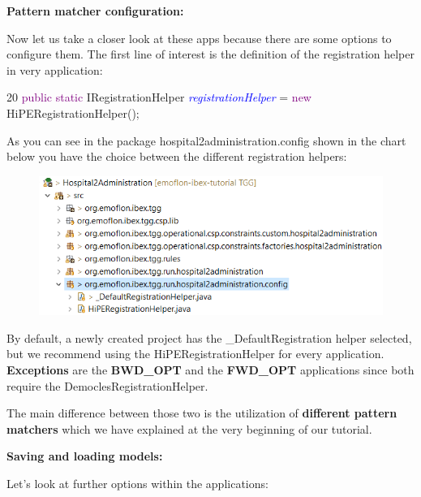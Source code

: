 {\textbf{Pattern matcher configuration:}

Now let us take a closer look at these apps because there are some options to configure them.
The first line of interest is the definition of the registration helper in very application:\newline

20\hspace{0.5cm} \textcolor{Purple}{public static} IRegistrationHelper \textcolor{Blue}{\textit{registrationHelper}} = \textcolor{Purple}{new} HiPERegistrationHelper();\newline

As you can see in the package \textsf{hospital2administration.config} shown in the chart below you have the choice between the different registration helpers:\newline

\begin{figure}[h]
    \centering
    \includegraphics[scale=0.65 ]{pictures/registrationHelpers.png}
    \caption{}
    \label{setDefaultNumber}
\end{figure}

By default, a newly created project has the \textsf{\_DefaultRegistration} helper selected, but we recommend using the \textsf{HiPERegistrationHelper} for every application. \textbf{Exceptions} are the \textbf{BWD\_OPT} and the \textbf{FWD\_OPT} applications since both require the \textsf{DemoclesRegistrationHelper}.

The main difference between those two is the utilization of \textbf{different pattern matchers} which we have explained at the very beginning of our tutorial. 

\clearpage

\textbf{Saving and loading models:}

Let's look at further options within the applications:

}
